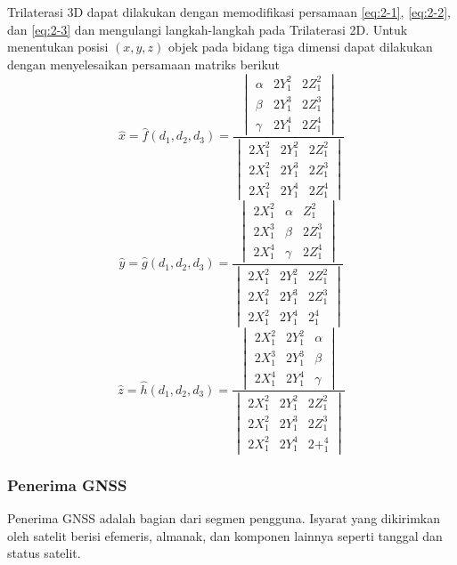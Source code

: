 Trilaterasi 3D dapat dilakukan dengan memodifikasi persamaan \ref{eq:2-1}, \ref{eq:2-2}, dan \ref{eq:2-3} dan mengulangi langkah-langkah pada Trilaterasi 2D. Untuk menentukan posisi $\left(x,y,z\right)$ objek pada bidang tiga dimensi dapat dilakukan dengan menyelesaikan persamaan matriks berikut
$$
\hat{x}=\hat{f}\left(d_1,d_2,d_3\right)=\frac{
	\begin{vmatrix}
		\alpha & 2Y_1^2 & 2Z_1^2\\
		\beta & 2Y_1^3 & 2Z_1^3\\
		\gamma & 2Y_1^4 & 2Z_1^4
\end{vmatrix}}
{
	\begin{vmatrix}
		2X_1^2 & 2Y_1^2 & 2Z_1^2\\
		2X_1^2 & 2Y_1^3 & 2Z_1^3\\
		2X_1^2 & 2Y_1^4 & 2Z_1^4
	\end{vmatrix}
}
$$
$$
\hat{y}=\hat{g}\left(d_1,d_2,d_3\right)=\frac{
	\begin{vmatrix}
		2X_1^2 & \alpha & Z_1^2\\
		2X_1^3 & \beta & 2Z_1^3\\
		2X_1^4 & \gamma & 2Z_1^4
	\end{vmatrix}
}
{
	\begin{vmatrix}
		2X_1^2 & 2Y_1^2 & 2Z_1^2\\
		2X_1^2 & 2Y_1^3 & 2Z_1^3\\
		2X_1^2 & 2Y_1^4 & 2_1^4
	\end{vmatrix}
}
$$
$$\hat{z}=\hat{h}\left(d_1,d_2,d_3\right)=\frac{
	\begin{vmatrix}
		2X_1^2 & 2Y_1^2 & \alpha\\
		2X_1^3 & 2Y_1^3  & \beta\\
		2X_1^4 & 2Y_1^4 & \gamma
\end{vmatrix}}
{
	\begin{vmatrix}
		2X_1^2 & 2Y_1^2 & 2Z_1^2\\
		2X_1^2 & 2Y_1^3 & 2Z_1^3\\
		2X_1^2 & 2Y_1^4 & 2+_1^4
	\end{vmatrix}
}
$$
\subsubsection{Penerima GNSS}
Penerima GNSS adalah bagian dari segmen pengguna. Isyarat yang dikirimkan oleh satelit berisi efemeris, almanak, dan komponen lainnya seperti tanggal dan status satelit.

